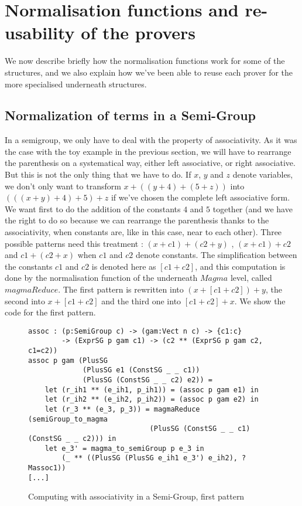 \section {Normalisation functions and re-usability of the provers}

We now describe briefly how the normalisation functions work for some of the structures, and we also explain how we've been able to reuse each prover for the more specialised underneath structures. 

	\subsection {Normalization of terms in a Semi-Group}
In a semigroup, we only have to deal with the property of associativity. As it was the case with the toy example in the previous section, we will have to rearrange the parenthesis on a systematical way, either left associative, or right associative. But this is not the only thing that we have to do. If $x$, $y$ and $z$ denote variables, we don't only want to transform $x+((y+4)+(5+z))$ into $(((x+y)+4)+5)+z$ if we've chosen the complete left associative form. We want first to do the addition of the constants $4$ and $5$ together (and we have the right to do so because we can rearrange the parenthesis thanks to the associativity, when constants are, like in this case, near to each other). Three possible patterns need this treatment : $(x+c1)+(c2+y)$ , $(x + c1) + c2$  and $c1 + (c2 + x)$ when $c1$ and $c2$ denote constants. The simplification between the constants $c1$ and $c2$ is denoted here as $[c1+c2]$, and this computation is done by the normalisation function of the underneath $Magma$ level, called $magmaReduce$.
The first pattern is rewritten into $(x + [c1+c2]) + y$, the second into $x + [c1+c2]$ and the third one into $[c1 + c2] + x$.
We show the code for the first pattern.

\begin{figure}[H]
\figrule
\begin{center}
\begin{verbatim}
assoc : (p:SemiGroup c) -> (gam:Vect n c) -> {c1:c} 
        -> (ExprSG p gam c1) -> (c2 ** (ExprSG p gam c2, c1=c2))
assoc p gam (PlusSG 
             (PlusSG e1 (ConstSG _ _ c1)) 
             (PlusSG (ConstSG _ _ c2) e2)) =
    let (r_ih1 ** (e_ih1, p_ih1)) = (assoc p gam e1) in
    let (r_ih2 ** (e_ih2, p_ih2)) = (assoc p gam e2) in
    let (r_3 ** (e_3, p_3)) = magmaReduce (semiGroup_to_magma 
                             (PlusSG (ConstSG _ _ c1) (ConstSG _ _ c2))) in
    let e_3' = magma_to_semiGroup p e_3 in
        (_ ** ((PlusSG (PlusSG e_ih1 e_3') e_ih2), ?Massoc1))
[...]
\end{verbatim}
\end{center}
\caption{Computing with associativity in a Semi-Group, first pattern}
\figrule
\end{figure}

